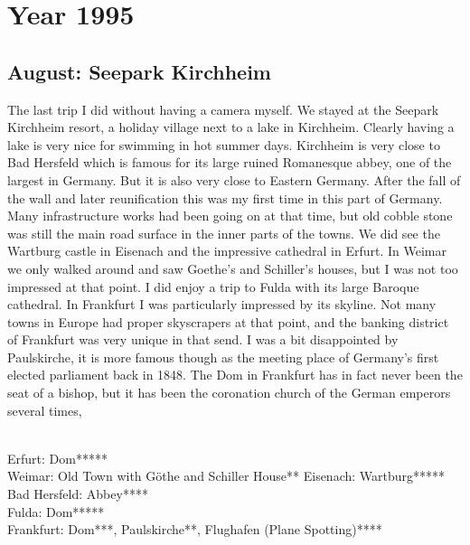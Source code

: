 \chapter{Year 1995}
\label{1995}

\section{August: Seepark Kirchheim}
\label{1995:Kirchheim}

The last trip I did without having a camera myself. We stayed at the Seepark Kirchheim resort, a holiday village next to a lake in Kirchheim. Clearly having a lake is very nice for swimming in hot summer days. Kirchheim is very close to Bad Hersfeld which is famous for its large ruined Romanesque abbey, one of the largest in Germany. But it is also very close to Eastern Germany. After the fall of the wall and later reunification this was my first time in this part of Germany. Many infrastructure works had been going on at that time, but old cobble stone was still the main road surface in the inner parts of the towns. We did see the Wartburg castle in Eisenach and the impressive cathedral in Erfurt. In Weimar we only walked around and saw Goethe's and Schiller's houses, but I was not too impressed at that point. I did enjoy a trip to Fulda with its large Baroque cathedral. In Frankfurt I was particularly impressed by its skyline. Not many towns in Europe had proper skyscrapers at that point, and the banking district of Frankfurt was very unique in that send. I was a bit disappointed by Paulskirche, it is more famous though as the meeting place of Germany's first elected parliament back in 1848. The Dom in Frankfurt has in fact never been the seat of a bishop, but it has been the coronation church of the German emperors several times,\\\

Erfurt: Dom*****\\
Weimar: Old Town with G\"othe and Schiller House**
Eisenach: Wartburg*****\\
Bad Hersfeld: Abbey****\\
Fulda: Dom*****\\
Frankfurt: Dom***, Paulskirche**, Flughafen (Plane Spotting)****